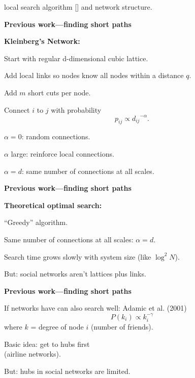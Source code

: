       local search algorithm
     [] and
      network structure.
     
   


  \textbf{Previous work---finding short paths}

  \textbf{Kleinberg's Network:}
    
    
      Start with
      regular d-dimensional cubic lattice.
     
      Add local links so 
      nodes know all nodes within a distance $q$.
    
      Add $m$ short cuts per node.
      
      Connect $i$ to $j$ with probability 
      $$ p_{ij} \propto {d_{ij}}^{-\alpha}. $$
    
  

  
   
    \alert{$\alpha=0$}: random connections.
    
    \alert{$\alpha$ large}: reinforce local connections.
   
    \alert{$\alpha=d$}: same number of connections at all scales.
  



  \textbf{Previous work---finding short paths}

  \textbf{Theoretical optimal search:}
    
     
      ``Greedy'' algorithm.
     
      Same number of connections at all scales: $\alpha=d$.
    

    \bigskip
    {
      Search time grows slowly with system size (like $\log^2N$).
      }


    \bigskip
    {
      \alert{But: social networks aren't lattices plus links.}
    }
    
  
  



  \textbf{Previous work---finding short paths}

  
   
    If networks have  can 
    also search well: Adamic et al. (2001)\cite{adamic2001a}
    $$ P(k_i) \propto k_i^{-\gamma}$$
    where $k$ = degree of node $i$ (number of friends).
  
    Basic idea: get to hubs first\\
    (airline networks).
     
    \alert{But: hubs in social networks are limited.}

